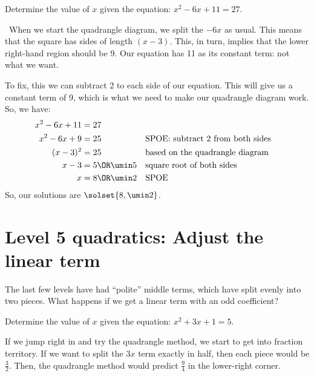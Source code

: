 \begin{boxedex}
Determine the value of $x$ given the equation: $x^2-6x+11=27$.

\exsoln\ When we start the quadrangle diagram, we split the $-6x$ as usual. This means that the square has sides of length $(x-3)$. This, in turn, implies that the lower right-hand region should be 9. Our equation has 11 as its constant term: not what we want.


To fix, this we can subtract 2 to each side of our equation. This will give us a constant term of 9, which is what we need to make our quadrangle diagram work. So, we have:
\begin{align*}
x^2 - 6x + 11 &= 27
\\
x^2 - 6x + 9 &= 25
&&\text{SPOE: subtract 2 from both sides}
\\
(x-3)^2 &= 25
&&\text{based on the quadrangle diagram}
\\
x-3 &= 5 \OR \umin5
&&\text{square root of both sides}
\\
x &= 8 \OR \umin2
&&\text{SPOE}
\end{align*}
So, our solutions are $\solset{8, \umin2}$.
\end{boxedex}

\section{Level 5 quadratics: Adjust the linear term}

The last few levels have had ``polite'' middle terms, which have split evenly into two pieces. What happens if we get a linear term with an odd coefficient?

\begin{boxedexplore}
Determine the value of $x$ given the equation: $x^2 + 3x + 1 = 5$.
\end{boxedexplore} %

If we jump right in and try the quadrangle method, we start to get into fraction territory. If we want to split the $3x$ term exactly in half, then each piece would be $\frac{3}{2}$. Then, the quadrangle method would predict $\frac{9}{4}$ in the lower-right corner.



